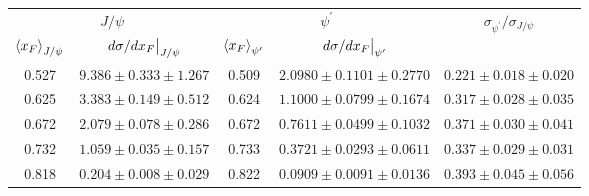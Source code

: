 \begin{tabular}{cc|cc|c}
\hline
\multicolumn{2}{c|}{$J/\psi$} &
  \multicolumn{2}{c|}{$\psi^{\prime}$} &
  \multirow{2}{*}{$\sigma_{\psi^\prime}/\sigma_{J/\psi}$} \\ \cline{1-4}
$\expval{x_F}_{J/\psi}$ &
  $\eval{d\sigma/dx_F}_{J/\psi}$ &
  $\expval{x_F}_{\psi^\prime}$ &
  $\eval{d\sigma/dx_F}_{\psi^\prime}$ &
   \\ \hline
\multicolumn{1}{c|}{0.527} &
  $9.386\pm0.333\pm1.267$ &
  \multicolumn{1}{c|}{0.509} &
  $2.0980\pm0.1101\pm0.2770$ &
  $0.221\pm0.018\pm0.020$ \\
\multicolumn{1}{c|}{0.625} &
  $3.383\pm0.149\pm0.512$ &
  \multicolumn{1}{c|}{0.624} &
  $1.1000\pm0.0799\pm0.1674$ &
  $0.317\pm0.028\pm0.035$ \\
\multicolumn{1}{c|}{0.672} &
  $2.079\pm0.078\pm0.286$ &
  \multicolumn{1}{c|}{0.672} &
  $0.7611\pm0.0499\pm0.1032$ &
  $0.371\pm0.030\pm0.041$ \\
\multicolumn{1}{c|}{0.732} &
  $1.059\pm0.035\pm0.157$ &
  \multicolumn{1}{c|}{0.733} &
  $0.3721\pm0.0293\pm0.0611$ &
  $0.337\pm0.029\pm0.031$ \\
\multicolumn{1}{c|}{0.818} &
  $0.204\pm0.008\pm0.029$ &
  \multicolumn{1}{c|}{0.822} &
  $0.0909\pm0.0091\pm0.0136$ &
  $0.393\pm0.045\pm0.056$ \\ \hline
\end{tabular}
